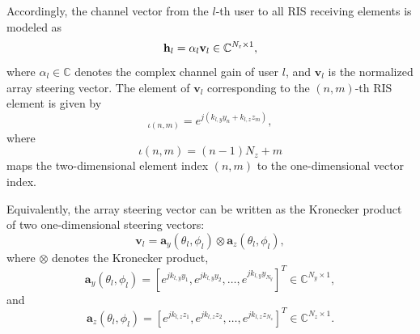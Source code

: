 \documentclass[journal]{IEEEtran}
\begin{document}
Accordingly, the channel vector from the $l$-th user to all RIS receiving elements is modeled as
\begin{equation}
\mathbf{h}_l
=
\alpha_l\mathbf{v}_l
\in\mathbb{C}^{N_{\rm r}\times 1},
\label{eq:user_channel_vector}
\end{equation}
where $\alpha_l\in\mathbb{C}$ denotes the complex channel gain of user $l$, and $\mathbf{v}_l$ is the normalized array steering vector. 
The element of $\mathbf{v}_l$ corresponding to the $(n,m)$-th RIS element is given by
\begin{equation}
[\mathbf{v}_l]_{\iota(n,m)}
=
e^{j(k_{l,y}y_n+k_{l,z}z_m)},
\label{eq:steering_element}
\end{equation}
where
\begin{equation}
\iota(n,m)=(n-1)N_z+m
\end{equation}
maps the two-dimensional element index $(n,m)$ to the one-dimensional vector index.

Equivalently, the array steering vector can be written as the Kronecker product of two one-dimensional steering vectors:
\begin{equation}
\mathbf{v}_l
=
\mathbf{a}_y(\theta_l,\phi_l)
\otimes
\mathbf{a}_z(\theta_l,\phi_l),
\label{eq:2d_steering_vector}
\end{equation}
where $\otimes$ denotes the Kronecker product,
\begin{equation}
\mathbf{a}_y(\theta_l,\phi_l)
=
\left[
e^{jk_{l,y}y_1},
e^{jk_{l,y}y_2},
\ldots,
e^{jk_{l,y}y_{N_y}}
\right]^T
\in\mathbb{C}^{N_y\times 1},
\label{eq:y_axis_steering}
\end{equation}
and
\begin{equation}
\mathbf{a}_z(\theta_l,\phi_l)
=
\left[
e^{jk_{l,z}z_1},
e^{jk_{l,z}z_2},
\ldots,
e^{jk_{l,z}z_{N_z}}
\right]^T
\in\mathbb{C}^{N_z\times 1}.
\label{eq:z_axis_steering}
\end{equation}
\end{document}
